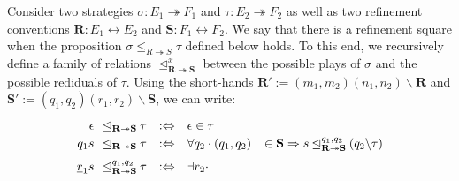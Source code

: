 \documentclass[acmsmall,screen,review,nonacm]{acmart}
\begin{document}
\begin{definition}
Consider two strategies
$\sigma : E_1 \twoheadrightarrow F_1$ and
$\tau : E_2 \twoheadrightarrow F_2$
as well as two refinement conventions
$\mathbf{R} : E_1 \leftrightarrow E_2$ and
$\mathbf{S} : F_1 \leftrightarrow F_2$.
We say that there is a refinement square
when the proposition
$\sigma \le_{R \twoheadrightarrow S} \tau$
defined below holds.
%
To this end,
we recursively define a family of relations
$\unlhd^x_{\mathbf{R} \twoheadrightarrow \mathbf{S}}$
between the possible plays of $\sigma$
and the possible rediduals of $\tau$.
Using the short-hands 
$\mathbf{R}' := (m_1,m_2)(n_1,n_2) \backslash \mathbf{R}$ and
$\mathbf{S}' := (q_1,q_2)(r_1,r_2) \backslash \mathbf{S}$,
we can write:
\[
\def\arraystretch{1.2}
\begin{array}{r@{\:\:\:}l@{\:}l@{\quad:\Leftrightarrow\quad}l}
  \epsilon &
  \unlhd_{\mathbf{R} \twoheadrightarrow \mathbf{S}} &
  \tau &
    \epsilon \in \tau
  \\
  q_1 s &
  \unlhd_{\mathbf{R} \twoheadrightarrow \mathbf{S}} &
  \tau &
    \forall q_2 \cdot
      (q_1, q_2)\bot \in \mathbf{S} \Rightarrow
      s \unlhd_{\mathbf{R} \twoheadrightarrow \mathbf{S}}^{q_1,q_2}
      (q_2 \backslash \tau)
  \\[1ex]
  \underline{r}_1 s &
  \unlhd_{\mathbf{R} \twoheadrightarrow \mathbf{S}}^{q_1,q_2} &
  \tau &
    \exists r_2 \cdot

\end{array}\]
\end{definition}
\end{document}
